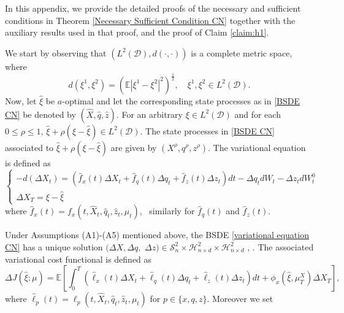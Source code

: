 \documentclass[11pt,a4paper]{article}
\begin{document}
\appendix 
\renewcommand{\thesection}{Appendix A} 
\section{} 
\label{appendix}
\renewcommand{\thesection}{A} 
In this appendix, we provide the detailed proofs of the necessary and sufficient conditions in Theorem \ref{Necessary Sufficient Condition CN} together with the auxiliary results used in that proof, and the proof of Claim \ref{claim:h1}.\medskip

\noindent We start by observing that $(L^2 (\mathcal D), d(\cdot,\cdot))$ is a complete metric space, where
\[
d(\xi^1, \xi^2)=\left(\mathbb E|\xi^1-\xi^2|^2\right)^{\frac{1}{2}}, \quad \xi^1,\xi^2 \in L^2 (\mathcal D).
\]
Now, let $\hat \xi$ be $a$-optimal and let the corresponding state processes as in \eqref{BSDE CN} be denoted by $(\hat  X, \hat  q, \hat  z)$. For an arbitrary $\xi \in L^2 (\mathcal D)$ and for each $0 \leq \rho \leq 1$, $\hat  \xi+\rho(\xi-\hat  \xi) \in L^2 (\mathcal D)$. The state processes in \eqref{BSDE CN} associated to $\hat  \xi+\rho(\xi-\hat  \xi)$ are given by $(X^\rho, q^\rho, z^\rho)$.
The variational equation is defined as 
\begin{equation}
\label{variational equation CN}
    \begin{cases}
        -d(\Delta{X}_t)=\left(\hat f_x(t)\Delta{X}_t+\hat f_q(t)\Delta{q}_t+\hat f_z(t)\Delta{z}_t \right)dt-\Delta{q}_tdW_t-\Delta{z}_tdW_t^0\\
        \Delta{X}_T=\xi-\hat \xi
        \end{cases}
\end{equation}
where $\hat f_x(t)=f_x(t, \hat X_t, \hat q_t, \hat z_t, \mu_t)$, \  similarly for $\hat f_q(t)$ and $\hat f_z(t)$.

Under Assumptions (A1)-(A5) mentioned above, the BSDE \eqref{variational equation CN} has a unique solution   $(\Delta X, \Delta q,$ $ \Delta z) \in \mathcal S^2 _n \times \mathcal H^2 _{n\times d} \times \mathcal H^2 _{n\times d}$  \cite[Theorem 2.1, p.18]{Karoui Peng Quenez}, \cite[Theorem 3.1, p.58]{Pardoux}.
The associated variational cost functional is defined as
\begin{equation}
\label{variational cost CN}
\Delta{J}(\hat \xi;\mu)=\mathbb E\left[\int_0^T \left (\hat \ell_x(t)\Delta{X}_t+\hat \ell_q(t)\Delta{q}_t+\hat  \ell_z(t)\Delta{z}_t\right)dt+\phi_x(\hat \xi,\mu_T^X)\Delta{X}_T\right],
\end{equation}
where $\hat \ell_p (t)=\ell_p (t, \hat X_t, \hat q_t, \hat z_t, \mu_t)$ for $p\in \{x,q,z\}$. Moreover we set
\end{document}
